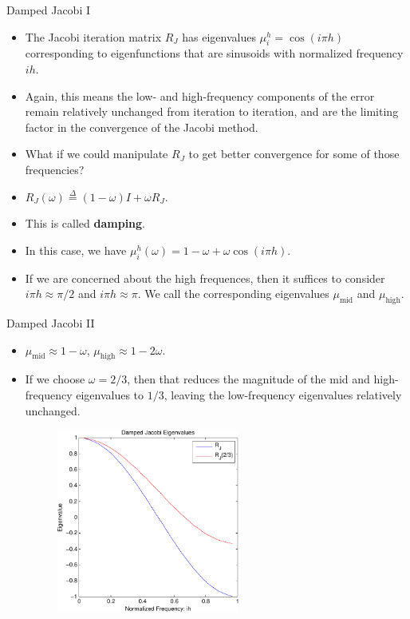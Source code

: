 \documentclass{beamer}
\providecommand{\defeq}{\stackrel{\Delta}{=}}
\begin{document}
\begin{frame}{Damped Jacobi I}
 \begin{itemize}
  \item The Jacobi iteration matrix $R_J$ has eigenvalues
        $\mu_i^h = \cos(i \pi h)$ corresponding to eigenfunctions that are
        sinusoids with normalized frequency $ih$.
  \item Again, this means the low- and high-frequency components of the error
        remain relatively unchanged from iteration to iteration, and are the
        limiting factor in the convergence of the Jacobi method.
  \item What if we could manipulate $R_J$ to get better convergence for some
        of those frequencies?
  \item $R_J(\omega) \defeq (1-\omega) I + \omega R_J$.
  \item This is called \textbf{damping}.
  \item In this case, we have $\mu_i^h(\omega) = 1 - \omega + \omega \cos(i \pi h)$.
  \item If we are concerned about the high frequences, then it suffices to
        consider $i \pi h \approx \pi/2$ and $i \pi h \approx \pi$. We call the corresponding
        eigenvalues $\mu_\text{mid}$ and $\mu_\text{high}$.
 \end{itemize}
\end{frame}

\begin{frame}{Damped Jacobi II}
 \begin{itemize}
  \item $\mu_\text{mid} \approx 1-\omega$, $\mu_\text{high} \approx 1-2\omega$.
  \item If we choose $\omega=2/3$, then that reduces the magnitude of the mid
        and high-frequency eigenvalues to $1/3$, leaving the low-frequency
        eigenvalues relatively unchanged.
  \begin{figure}
   \includegraphics[width=6cm]{images/dampedJacobi.pdf}
  \end{figure}
 \end{itemize}
\end{frame}
\end{document}
